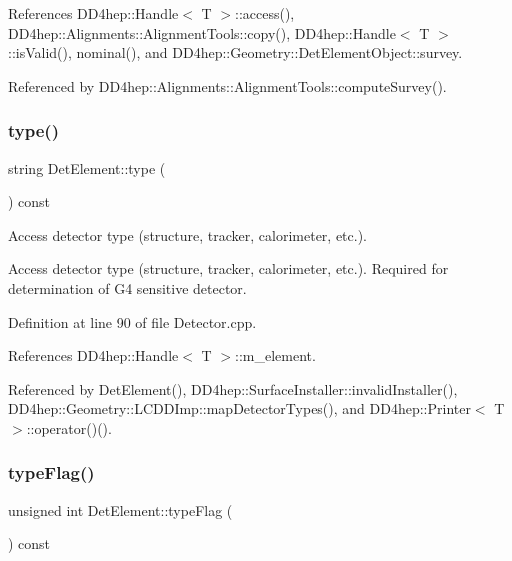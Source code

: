 References D\+D4hep\+::\+Handle$<$ T $>$\+::access(), D\+D4hep\+::\+Alignments\+::\+Alignment\+Tools\+::copy(), D\+D4hep\+::\+Handle$<$ T $>$\+::is\+Valid(), nominal(), and D\+D4hep\+::\+Geometry\+::\+Det\+Element\+Object\+::survey.



Referenced by D\+D4hep\+::\+Alignments\+::\+Alignment\+Tools\+::compute\+Survey().

\hypertarget{class_d_d4hep_1_1_geometry_1_1_det_element_a47782470bbe890c880a2824de6d1b547}{}\label{class_d_d4hep_1_1_geometry_1_1_det_element_a47782470bbe890c880a2824de6d1b547} 
\subsubsection{\texorpdfstring{type()}{type()}}
{\footnotesize\ttfamily string Det\+Element\+::type (\begin{DoxyParamCaption}{ }\end{DoxyParamCaption}) const}



Access detector type (structure, tracker, calorimeter, etc.). 

Access detector type (structure, tracker, calorimeter, etc.). Required for determination of G4 sensitive detector. 

Definition at line 90 of file Detector.\+cpp.



References D\+D4hep\+::\+Handle$<$ T $>$\+::m\+\_\+element.



Referenced by Det\+Element(), D\+D4hep\+::\+Surface\+Installer\+::invalid\+Installer(), D\+D4hep\+::\+Geometry\+::\+L\+C\+D\+D\+Imp\+::map\+Detector\+Types(), and D\+D4hep\+::\+Printer$<$ T $>$\+::operator()().

\hypertarget{class_d_d4hep_1_1_geometry_1_1_det_element_a06ea400c02eee5687ff5c996ad53198d}{}\label{class_d_d4hep_1_1_geometry_1_1_det_element_a06ea400c02eee5687ff5c996ad53198d} 
\subsubsection{\texorpdfstring{type\+Flag()}{typeFlag()}}
{\footnotesize\ttfamily unsigned int Det\+Element\+::type\+Flag (\begin{DoxyParamCaption}{ }\end{DoxyParamCaption}) const}



